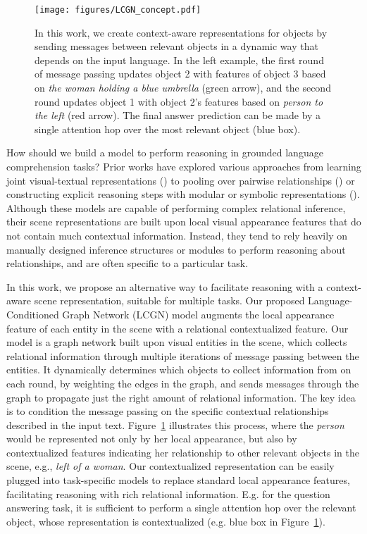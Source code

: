 \documentclass[10pt,twocolumn,letterpaper]{article}
\begin{document}
\begin{figure}[t]
\vspace{-1em}
\centering
\texttt{[image: figures/LCGN\_concept.pdf]}
\caption{\small
In this work, we create context-aware representations for objects by sending messages between relevant objects in a dynamic way that depends on the input language. In the left example, the first round of message passing updates object 2 with features of object 3 based on \textit{the woman holding a blue umbrella} (green arrow), and the second round updates object 1 with object 2's features based on \textit{person to the left} (red arrow). The final answer prediction can be made by a single attention hop over the most relevant object (blue box).}
\label{fig:teaser}
\vspace{-1.5em}
\end{figure}

How should we build a model to perform reasoning in  grounded language comprehension tasks? Prior works have explored various approaches from learning joint visual-textual representations (\eg \cite{fukui2016multimodal,perez2018film}) to pooling over pairwise relationships (\eg \cite{santoro2017simple,yu2018mattnet}) or constructing explicit reasoning steps with modular or symbolic representations (\eg \cite{andreas16neural,yi2018neural}). Although these models are capable of performing complex relational inference, their scene representations are built upon local visual appearance features that do not contain much contextual information. Instead, they tend to rely heavily on manually designed inference structures or modules to perform reasoning about relationships, and are often specific to a particular task. 
 
In this work, we propose an alternative way to facilitate reasoning with a context-aware scene representation, suitable for multiple tasks. Our proposed Language-Conditioned Graph Network (LCGN) model augments the local appearance feature of each entity in the scene with a relational contextualized feature. Our model is a graph network built upon visual entities in the scene, which collects relational information through multiple iterations of message passing between the entities. It dynamically determines which objects to collect information from on each round, by weighting the edges in the graph, and sends messages through the graph to propagate just the right amount of relational information. The key idea is to condition the message passing on the specific contextual relationships described in the input text. Figure~\ref{fig:teaser} illustrates this process, where the \textit{person} would be represented not only by her local appearance, but also by contextualized features indicating her relationship to other relevant objects in the scene, e.g., \textit{left of a woman}.  
Our contextualized representation can be easily plugged into task-specific models to replace standard local appearance features, facilitating reasoning with rich relational information. E.g. for the question answering task, it is sufficient to perform a single attention hop over the relevant object, whose representation is contextualized (e.g. blue box in Figure~\ref{fig:teaser}). 
\end{document}
